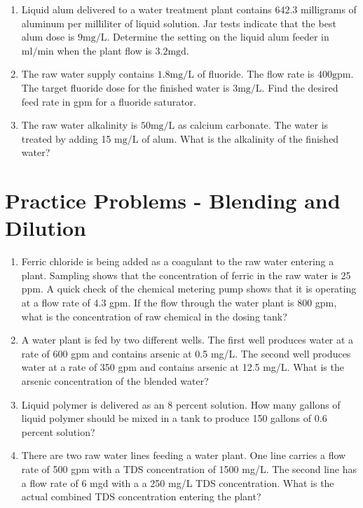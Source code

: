 \begin{enumerate}
  \item Liquid alum delivered to a water treatment plant contains $642.3$ milligrams of aluminum per milliliter of liquid solution. Jar tests indicate that the best alum dose is $9 \mathrm{mg} / \mathrm{L}$. Determine the setting on the liquid alum feeder in $\mathrm{ml} / \mathrm{min}$ when the plant flow is $3.2 \mathrm{mgd}$.

  \item The raw water supply contains $1.8 \mathrm{mg} / \mathrm{L}$ of fluoride. The flow rate is $400 \mathrm{gpm}$. The target fluoride dose for the finished water is $3 \mathrm{mg} / \mathrm{L}$. Find the desired feed rate in gpm for a fluoride saturator.

  \item The raw water alkalinity is $50 \mathrm{mg} / \mathrm{L}$ as calcium carbonate. The water is treated by adding 15 $\mathrm{mg} / \mathrm{L}$ of alum. What is the alkalinity of the finished water?

\end{enumerate}

\section*{Practice Problems - Blending and Dilution}

\begin{enumerate}
\item Ferric chloride is being added as a coagulant to the raw water entering a plant. Sampling
shows that the concentration of ferric in the raw water is 25 ppm. A quick check of the chemical
metering pump shows that it is operating at a flow rate of 4.3 gpm. If the flow through the water
plant is 800 gpm, what is the concentration of raw chemical in the dosing tank?

\item A water plant is fed by two different wells. The first well produces water at a rate of 600
gpm and contains arsenic at 0.5 mg/L. The second well produces water at a rate of 350 gpm and
contains arsenic at 12.5 mg/L. What is the arsenic concentration of the blended water?

\item Liquid polymer is delivered as an 8 percent solution. How many gallons of liquid polymer
should be mixed in a tank to produce 150 gallons of 0.6 percent solution?

\item There are two raw water lines feeding a water plant. One line carries a flow rate of 500 gpm
with a TDS concentration of 1500 mg/L. The second line has a flow rate of 6 mgd with a a 250
mg/L TDS concentration. What is the actual combined TDS concentration entering the plant?
\end{enumerate}

